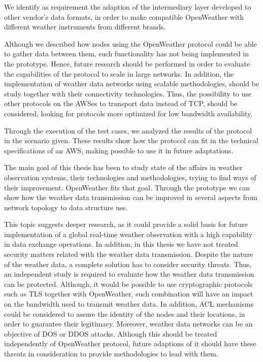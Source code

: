 We identify as requirement the adaption of the intermediary layer developed to other vendor's data formats, in order to make compatible OpenWeather with different weather instruments from different brands.

Although we described how nodes using the OpenWeather protocol could be able to gather data between them, such functionality has not being implemented in the prototype. Hence, future research should be performed in order to evaluate the capabilities of the protocol to scale in large networks. In addition, the implementation of weather data networks using scalable methodologies, should be study together with their connectivity technologies. Thus, the possibility to use other protocols on the \gls{AWS}es to transport data instead of \gls{TCP}, should be considered, looking for protocols more optimized for low bandwidth availability.

Through the execution of the test cases, we analyzed the results of the protocol in the scenario given. These results show how the protocol can fit in the technical specifications of an \gls{AWS}, making possible to use it in future adaptations.

The main goal of this thesis has been to study state of the affairs in weather observation systems, their technologies and methodologies, trying to find ways of their improvement. OpenWeather fits that goal. Through the prototype we can show how the weather data transmission can be improved in several aspects from network topology to data structure use.

This topic suggests deeper research, as it could provide a solid basis for future implementation of a global real-time weather observation with a high capability in data exchange operations. In addition, in this thesis we have not treated security matters related with the weather data transmission. Despite the nature of the weather data, a complete solution has to consider security threats. Thus, an independent study is required to evaluate how the weather data transmission can be protected. Although, it would be possible to use cryptographic protocols such as \gls{TLS} together with OpenWeather, such combination will have an impact on the bandwidth used to transmit weather data. In addition, \gls{ACL} mechanisms could be considered to assure the identity of the nodes and their locations, in order to guarantee their legitimacy. Moreover, weather data networks can be an objective of \gls{DOS} or \gls{DDOS} attacks. Although this should be treated independently of OpenWeather protocol, future adaptions of it should have these threats in consideration to provide methodologies to lead with them.

